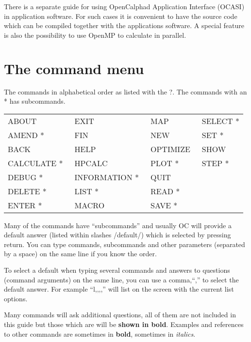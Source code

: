 \documentclass[11pt]{article}
\begin{document}
There is a separate guide for using OpenCalphad Application Interface
(OCASI) in application software.  For such cases it is convenient to
have the source code which can be compiled together with the
applications software.  A special feature is also the possibility to
use OpenMP to calculate in parallel.

\newpage


\hypertarget{All commands}{}
\section{The command menu}

The commands in alphabetical order as listed with the ?.  The commands
with an * has subcommands.

\begin{tabular}{llll}
ABOUT           & EXIT           & MAP           & SELECT * \\
AMEND *         & FIN            & NEW           & SET * \\
BACK            & HELP           & OPTIMIZE~     & SHOW  \\
CALCULATE *~    & HPCALC         & PLOT *        & STEP * \\
DEBUG *         & INFORMATION *~ & QUIT    \\
DELETE *        & LIST *         & READ * \\
ENTER *         & MACRO          & SAVE *\\
\end{tabular}

Many of the commands have ``subcommands'' and usually OC will provide
a default answer (listed within slashes /default/) which is selected
by pressing return.  You can type commands, subcommands and other
parameters (separated by a space) on the same line if you know the
order.

To select a default when typing several commands and answers to
questions (command arguments) on the same line, you can use a
comma,``,'' to select the default answer.  For example ``l,,,,'' will
list on the screen with the current list options.

Many commands will ask additional questions, all of them are not
included in this guide but those which are will be {\bf shown in
  bold}.  Examples and references to other commands are sometimes in
{\bf bold}, sometimes in {\em italics}.
\end{document}
